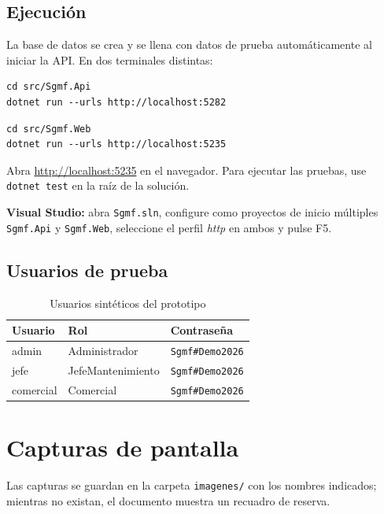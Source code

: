 \documentclass[12pt,letterpaper]{article}
\begin{document}
\subsection{Ejecución}

La base de datos se crea y se llena con datos de prueba automáticamente al iniciar la API. En dos terminales distintas:

\begin{lstlisting}
cd src/Sgmf.Api
dotnet run --urls http://localhost:5282
\end{lstlisting}

\begin{lstlisting}
cd src/Sgmf.Web
dotnet run --urls http://localhost:5235
\end{lstlisting}

Abra \url{http://localhost:5235} en el navegador. Para ejecutar las pruebas, use \texttt{dotnet test} en la raíz de la solución.

\textbf{Visual Studio:} abra \texttt{Sgmf.sln}, configure como proyectos de inicio múltiples \texttt{Sgmf.Api} y \texttt{Sgmf.Web}, seleccione el perfil \emph{http} en ambos y pulse F5.

\subsection{Usuarios de prueba}

\begin{table}[H]
  \centering
  \caption{Usuarios sintéticos del prototipo}\label{tab:usuarios}
  \begin{tabular}{@{}lll@{}}
    \toprule
    Usuario & Rol & Contraseña \\
    \midrule
    admin & Administrador & \texttt{Sgmf\#Demo2026} \\
    jefe & JefeMantenimiento & \texttt{Sgmf\#Demo2026} \\
    comercial & Comercial & \texttt{Sgmf\#Demo2026} \\
    \bottomrule
  \end{tabular}
\end{table}

\section{Capturas de pantalla}\label{sec:capturas}

Las capturas se guardan en la carpeta \texttt{imagenes/} con los nombres indicados; mientras no existan, el documento muestra un recuadro de reserva.
\end{document}
